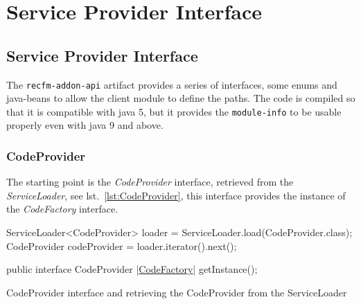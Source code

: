 \documentclass[a4paper,10pt]{report}
\newenvironment{elisting}[1][H]
  {\captionsetup{aboveskip=0pt}\begin{listing}[#1]}
  {\end{listing}%
}
\begin{document}
%

\clearpage

\tableofcontents

\clearpage

\part{Service Provider Interface}\label{vol:spi}

%                                           

\chapter{Service Provider Interface}
The \verb!recfm-addon-api! artifact provides a series of interfaces, some enums 
and java-beans to allow the client module to define the paths. 
The code is compiled so that it is compatible with java 5, but it provides the 
\verb!module-info! to be usable properly even with java 9 and above.

\section{CodeProvider}
The starting point is the \textsl{CodeProvider} interface, retrieved from the 
\textsl{ServiceLoader}, see lst.~\ref{lst:CodeProvider}, this interface
provides the instance of the \textsl{CodeFactory} interface.

\begin{elisting}[!htb]
\begin{javacode}
      ServiceLoader<CodeProvider> loader = ServiceLoader.load(CodeProvider.class);
      CodeProvider codeProvider = loader.iterator().next();
\end{javacode}
\vspace*{-1cm}
\begin{javacode}
public interface CodeProvider {
     |\hyperref[lst:CodeFactory]{CodeFactory}| getInstance();
}
\end{javacode}
\caption{CodeProvider interface and retrieving the CodeProvider from the ServiceLoader}
\label{lst:CodeProvider}
\end{elisting}
\end{document}
